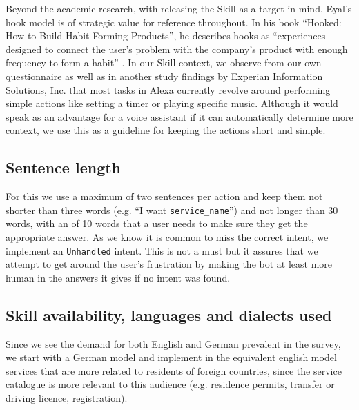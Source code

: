Beyond the academic research, with releasing the Skill as a target in mind, Eyal's hook model \cite{medium:skillmarketing} is of strategic value for reference throughout. In his book ``Hooked: How to Build Habit-Forming Products'', he describes hooks as “experiences designed to connect the user’s problem with the company’s product with enough frequency to form a habit'' \cite{eyal:hook}.
%
%
%
In our Skill context, we observe from our own questionnaire as well as in another study findings by Experian Information Solutions, Inc. \cite{experian} that 
most tasks in Alexa currently revolve around performing simple actions like setting a timer or playing specific music.
Although it would speak as an advantage for a voice assistant if it can automatically determine more context, we use this as a guideline for keeping the actions short and simple.

\subsection*{Sentence length}
For this we use a maximum of two sentences per action and keep them not shorter than three words (e.g. ``I want \texttt{service_name}'') and not longer than 30 words, with an of 10 words that a user needs to make sure they get the appropriate answer.
As we know it is common to miss the correct intent, we implement an  \texttt{Unhandled} intent. This is not a must but it assures that we 
attempt to get around the user's frustration by making the bot at least more human in the answers it gives if no intent was found.	

\subsection*{Skill availability,  languages and dialects used}
Since we see the demand for both English and German prevalent in the survey, we start with a German model and implement in the equivalent english model services that are more related to residents of foreign countries, since the service catalogue is more relevant to this audience (e.g. residence permits, transfer or driving licence, registration).



